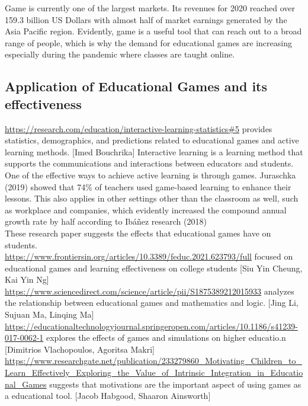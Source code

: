 Game is currently one of the largest markets. Its revenues for 2020 reached over 159.3 billion US Dollars with almost half of market earnings generated by the Asia Pacific region. Evidently, game is a useful tool that can reach out to a broad range of people, which is why the demand for educational games are increasing especially during the pandemic where classes are taught online.\\[2cm]


\subsection{Application of Educational Games and its effectiveness}
\url{https://research.com/education/interactive-learning-statistics#5} provides statistics, demographics, and predictions related to educational games and active learning methods. [Imed Bouchrika]
Interactive learning is a learning method that supports the communications and interactions between educators and students. One of the effective ways to achieve active learning is through games. Juraschka (2019) showed that 74\% of teachers used game-based learning to enhance their lessons. This also applies in other settings other than the classroom as well, such as workplace and companies, which evidently increased the compound annual growth rate by half according to Ibáñez research (2018)\\

These research paper suggests the effects that educational games have on students.\\
\url{https://www.frontiersin.org/articles/10.3389/feduc.2021.623793/full} focused on educational games and learning effectiveness on college students [Siu Yin Cheung, Kai Yin Ng]\\
\url{https://www.sciencedirect.com/science/article/pii/S1875389212015933} analyzes the relationship between educational games and mathematics and logic. [Jing Li, Sujuan Ma, Linqing Ma]\\
\url{https://educationaltechnologyjournal.springeropen.com/articles/10.1186/s41239-017-0062-1} explores the effects of games and simulations on higher educatio.n [Dimitrios Vlachopoulos, Agoritsa Makri]\\
\url{https://www.researchgate.net/publication/233279860_Motivating_Children_to_Learn_Effectively_Exploring_the_Value_of_Intrinsic_Integration_in_Educational_Games}
suggests that motivations are the important aspect of using games as a educational tool. [Jacob Habgood, Shaaron Ainsworth]\\

